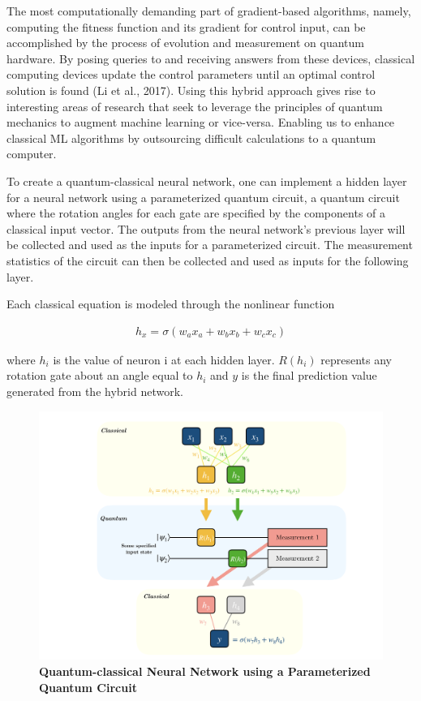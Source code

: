 \documentclass{scrartcl}
\makeatletter
\newcommand{\citeprocitem}[2]{\hyper@linkstart{cite}{citeproc_bib_item_#1}#2\hyper@linkend}
\makeatother
\begin{document}
The most computationally demanding part of gradient-based algorithms, namely, computing the fitness function and its gradient for control input, can be accomplished by the process of evolution and measurement on quantum hardware. By posing queries to and receiving answers from these devices, classical computing devices update the control parameters until an optimal control solution is found (\citeprocitem{9}{Li et al., 2017}). Using this hybrid approach gives rise to interesting areas of research that seek to leverage the principles of quantum mechanics to augment machine learning or vice-versa. Enabling us to enhance classical ML algorithms by outsourcing difficult calculations to a quantum computer.

To create a quantum-classical neural network, one can implement a hidden layer for a neural network using a parameterized quantum circuit, a quantum circuit where the rotation angles for each gate are specified by the components of a classical input vector. The outputs from the neural network's previous layer will be collected and used as the inputs for a parameterized circuit. The measurement statistics of the circuit can then be collected and used as inputs for the following layer.

Each classical equation is modeled through the nonlinear function

\begin{align}
h_{x}=\sigma(w_{a}x_{a}+w_{b}x_{b}+w_{c}x_{c})
\end{align}

where \(h_{i}\) is the value of neuron i at each hidden layer. \(R(h_{i})\) represents any rotation gate about an angle equal to \(h_{i}\) and \(y\) is the final prediction value generated from the hybrid network.

\begin{figure}[htbp]
\centering
\includegraphics[width=.9\linewidth]{./assets/neuralnetworkQC.png}
\caption{\textbf{Quantum-classical Neural Network using a Parameterized Quantum Circuit}}
\end{figure}
\end{document}
